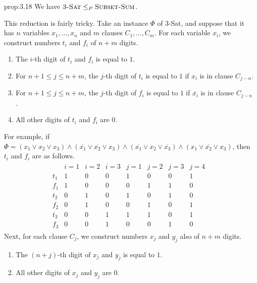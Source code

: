 \begin{prop}{prop:3.18}
    We have $\textsc{3-Sat} \leq_P \textsc{Subset-Sum}$.
\end{prop}
\begin{pf}
    This reduction is fairly tricky. Take an instance $\Phi$ of {\sc $3$-Sat},
    and suppose that it has $n$ variables $x_1, \dots, x_n$ and 
    $m$ clauses $C_1, \dots, C_m$. For each variable $x_i$, we construct 
    numbers $t_i$ and $f_i$ of $n+m$ digits. 
    \begin{enumerate}[(1)]
        \item The $i$-th digit of $t_i$ and $f_i$ is equal to $1$. 
        \item For $n+1 \leq j \leq n+m$, the $j$-th digit of $t_i$ is 
        equal to $1$ if $x_i$ is in clause $C_{j-n}$.
        \item For $n+1 \leq j \leq n+m$, the $j$-th digit of $f_i$ is 
        equal to $1$ if $\overline{x_i}$ is in clause $C_{j-n}$. 
        \item All other digits of $t_i$ and $f_i$ are $0$. 
    \end{enumerate}
    For example, if $\Phi = (x_1 \vee x_2 \vee x_3) \wedge 
    (\overline{x_1} \vee \overline{x_2} \vee x_3) \wedge 
    (\overline{x_1} \vee x_2 \vee \overline{x_3}) \wedge 
    (x_1 \vee \overline{x_2} \vee x_3)$, then $t_i$ and $f_i$ are as follows. 
    \begin{align*}
        \begin{array}{c|ccc|cccc}
            & i=1 & i=2 & i=3 & j=1 & j=2 & j=3 & j=4 \\ \hline 
            t_1 & 1 & 0 & 0 & 1 & 0 & 0 & 1 \\ 
            f_1 & 1 & 0 & 0 & 0 & 1 & 1 & 0 \\ 
            t_2 & 0 & 1 & 0 & 1 & 0 & 1 & 0 \\ 
            f_2 & 0 & 1 & 0 & 0 & 1 & 0 & 1 \\ 
            t_3 & 0 & 0 & 1 & 1 & 1 & 0 & 1 \\ 
            f_3 & 0 & 0 & 1 & 0 & 0 & 1 & 0
        \end{array}
    \end{align*}
    Next, for each clause $C_j$, we construct numbers $x_j$ and $y_j$ 
    also of $n+m$ digits. 
    \begin{enumerate}[(1)]
        \item The $(n+j)$-th digit of $x_j$ and $y_j$ is equal to $1$. 
        \item All other digits of $x_j$ and $y_j$ are $0$. 

\end{enumerate}
\end{pf}

